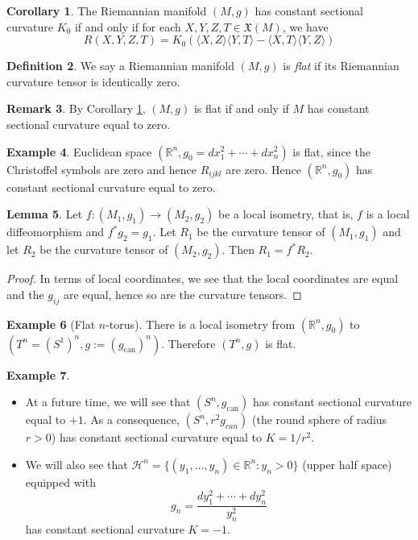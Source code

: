 \documentclass{amsart}
\numberwithin{equation}{section}
\newcommand{\bR}{\mathbb{R}}
\newcommand{\fX}{\mathfrak{X}}
\theoremstyle{definition}
\newtheorem{definition}{Definition} [section]
\newtheorem{example}[definition]{Example}
\newtheorem{remark}[definition]{Remark}
\theoremstyle{theorem}
\newtheorem{corollary}[definition]{Corollary}
\newtheorem{lemma}[definition]{Lemma}
\begin{document}
\begin{corollary}\label{constant-K}
The Riemannian manifold $(M,g)$ has constant sectional curvature $K_0$ if and only if for each 
$X,Y,Z,T \in \fX(M)$, we have 
\[
R(X,Y,Z,T) = K_0\left( \langle X, Z \rangle \langle Y, T \rangle - \langle X, T \rangle \langle Y, Z \rangle \right)
\]
\end{corollary}

\begin{definition}
We say a Riemannian manifold $(M,g)$ is {\em flat} if its Riemannian curvature tensor is identically zero. 
\end{definition}

\begin{remark}
By Corollary \ref{constant-K}, $(M,g)$ is flat if and only if $M$ has constant sectional curvature equal to zero. 
\end{remark}

\begin{example}
Euclidean space $(\bR^n, g_0=dx_1^2+\cdots + dx_n^2)$ is flat, since the Christoffel symbols are zero and hence 
$R_{ijkl}$ are zero. Hence $(\mathbb{R}^n, g_0)$ has constant sectional curvature equal to zero. 
\end{example}

\begin{lemma}
Let $f : (M_1, g_1) \to (M_2, g_2)$ be a local isometry, that is, $f$ is a local diffeomorphism and $f^*g_2 = g_1$. 
Let $R_1$ be the curvature tensor of $(M_1, g_1)$ and let $R_2$ be the curvature tensor of $(M_2, g_2)$. Then $R_1 = f^*R_2$. 
\end{lemma}

\begin{proof}
In terms of local coordinates, we see that the local coordinates are equal and the $g_{ij}$ are equal, hence so are the curvature tensors. 
\end{proof}

\begin{example}[Flat $n$-torus]
There is a local isometry from $(\bR^n,g_0)$ to $(T^n= (S^1)^n, g:= (g_{\mathrm{can}})^n)$. Therefore
$(T^n,g)$ is flat. 
\end{example}

\begin{example}
\begin{itemize}
\item At a future time, we will see that $(S^n, g_{\mathrm{can}})$ has constant sectional curvature equal to $+1$.
As a consequence,  $(S^n, r^2g_{can})$  (the round sphere of radius $r>0$) has constant sectional curvature equal to 
$K = 1/r^2$. 
\item We will also see that $\mathcal{H}^n=\{(y_1,\ldots,y_n)\in \bR^n: y_n>0\}$ (upper half space) equipped with 
\[
g_n = \frac{dy_1^2 + \cdots + dy_n^2}{y_n^2}
\]
has constant sectional curvature $K = -1$. 
\end{itemize}
\end{example}
\end{document}
